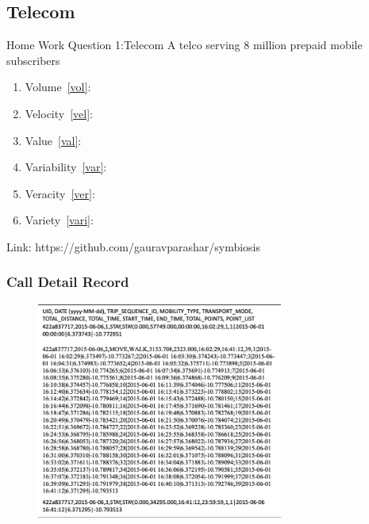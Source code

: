 \documentclass[pdf]{beamer}
\begin{document}
\subsection{ Telecom}
\begin{frame}[allowframebreaks, label={iv1}]{Home Work Question 1:Telecom}
A telco\cite{vtata} serving 8 million prepaid mobile subscribers
\begin{enumerate}
	\item Volume~\ref{vol}: \underline{\hspace{3cm}}
	\item Velocity~\ref{vel}:  \underline{\hspace{3cm}}
	\item Value~\ref{val}: \underline{\hspace{3cm}}
	\item Variability~\ref{var}: \underline{\hspace{3cm}}
	\item Veracity~\ref{ver}:  \underline{\hspace{3cm}}
	\item Variety~\ref{vari}:  \underline{\hspace{3cm}}
\end{enumerate}

Link: https://github.com/gauravparashar/symbiosis

\end{frame}

\subsubsection{Call Detail Record}
\begin{frame}[fragile]{}
\begin{figure}[ht]
	    \begin{center}
        		\includegraphics[height=2.8in]{cdr.png}
    \end{center}
    \end{figure}
\end{frame}
\end{document}
